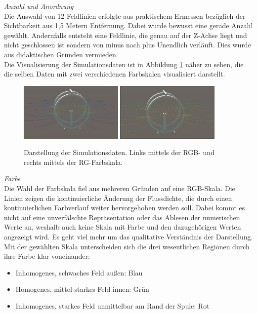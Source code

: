 \textit{Anzahl und Anordnung}\\
Die Auswahl von 12 Feldlinien erfolgte aus praktischem Ermessen bezüglich der Sichtbarkeit aus 1,5 Metern Entfernung. Dabei wurde bewusst eine gerade Anzahl gewählt. Andernfalls entsteht eine Feldlinie, die genau auf der Z-Achse liegt und nicht geschlossen ist sondern von minus nach plus Unendlich verläuft. Dies wurde aus didaktischen Gründen vermieden.\\
\noindent\hspace*{5mm}
Die Visualisierung der Simulationsdaten ist in Abbildung \ref{img:mfield-simulation} näher zu sehen, die die selben Daten mit zwei verschiedenen Farbskalen visualisiert darstellt.
\begin{figure}[h!]
	\centering
	\includegraphics[width=0.45\textwidth]{images/unity/simulation_rgb.jpg}
	\hspace{0.03\textwidth}
	\includegraphics[width=0.45\textwidth]{images/unity/simulation.jpg}
	\caption{Darstellung der Simulationsdaten. Links mittels der RGB- und rechts mittels der RG-Farbskala.}
	\label{img:mfield-simulation}
\end{figure}

\textit{Farbe}\\
Die Wahl der Farbskala fiel aus mehreren Gründen auf eine RGB-Skala. Die Linien zeigen die kontinuierliche Änderung der Flussdichte, die durch einen kontinuierlichen Farbverlauf weiter hervorgehoben werden soll. Dabei kommt es nicht auf eine unverfälschte Repräsentation oder das Ablesen der numerischen Werte an, weshalb auch keine Skala mit Farbe und den dazugehörigen Werten angezeigt wird. Es geht viel mehr um das qualitative Verständnis der Darstellung. Mit der gewählten Skala unterscheiden sich die drei wesentlichen Regionen durch ihre Farbe klar voneinander:
\begin{itemize}
	\setlength{\itemsep}{-1pt}
	\singlespacing
	\item Inhomogenes, schwaches Feld außen: Blau
	\item Homogenes, mittel-starkes Feld innen: Grün
	\item Inhomogenes, starkes Feld unmittelbar am Rand der Spule: Rot
\end{itemize}

